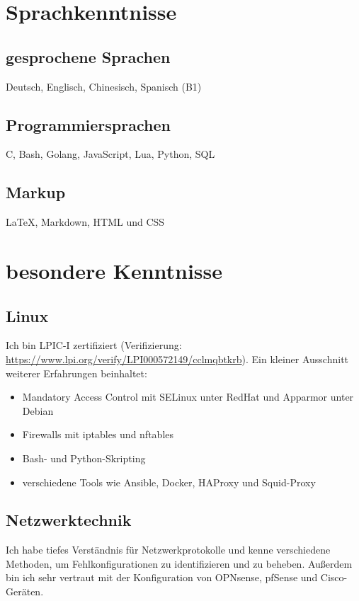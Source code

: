 \documentclass{article}
\begin{document}
\section{Sprachkenntnisse}

\subsection{gesprochene Sprachen}
Deutsch, Englisch, Chinesisch, Spanisch (B1)

\subsection{Programmiersprachen}
C, Bash, Golang, JavaScript, Lua, Python, SQL

\subsection{Markup}
\LaTeX, Markdown, HTML und CSS

\section{besondere Kenntnisse}

\subsection{Linux}
Ich bin LPIC-I zertifiziert (Verifizierung: \href{https://www.lpi.org/verify/LPI000572149/cclmqbtkrb}{https://www.lpi.org/verify/LPI000572149/cclmqbtkrb}).
Ein kleiner Ausschnitt weiterer Erfahrungen beinhaltet:
\begin{itemize}
\item{Mandatory Access Control mit SELinux unter RedHat und Apparmor unter Debian}
\item{Firewalls mit iptables und nftables}
\item{Bash- und Python-Skripting}
\item{verschiedene Tools wie Ansible, Docker, HAProxy und Squid-Proxy}
\end{itemize}

\subsection{Netzwerktechnik}
Ich habe tiefes Verständnis für Netzwerkprotokolle und kenne verschiedene Methoden, um Fehlkonfigurationen zu identifizieren und zu beheben.
Außerdem bin ich sehr vertraut mit der Konfiguration von OPNsense, pfSense und Cisco-Geräten.
\end{document}
